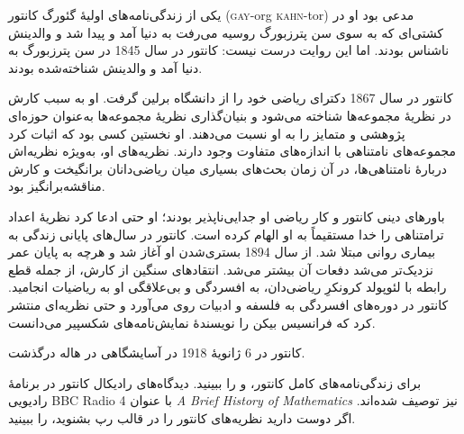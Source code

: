 \documentclass[../../../include/open-logic-section]{subfiles}
\begin{document}



یکی از زندگی‌نامه‌های اولیهٔ گئورگ کانتور
(\textsc{gay}-org \textsc{kahn}-tor) مدعی بود او در کشتی‌ای که به سوی
سن پترزبورگ روسیه می‌رفت به دنیا آمد و پیدا شد و والدینش ناشناس بودند.
اما این روایت درست نیست: کانتور در سال 1845 در سن پترزبورگ به دنیا آمد
و والدینش شناخته‌شده بودند.

کانتور در سال 1867 دکترای ریاضی خود را از دانشگاه برلین گرفت. او به
سبب کارش در نظریهٔ مجموعه‌ها شناخته می‌شود و بنیان‌گذاری نظریهٔ
مجموعه‌ها به‌عنوان حوزه‌ای پژوهشی و متمایز را به او نسبت می‌دهند. او
نخستین کسی بود که اثبات کرد مجموعه‌های نامتناهی با اندازه‌های متفاوت
وجود دارند. نظریه‌های او، به‌ویژه نظریه‌اش دربارهٔ نامتناهی‌ها، در آن
زمان بحث‌های بسیاری میان ریاضی‌دانان برانگیخت و کارش مناقشه‌برانگیز بود.

باورهای دینی کانتور و کار ریاضی او جدایی‌ناپذیر بودند؛ او حتی ادعا کرد
نظریهٔ اعداد ترامتناهی را خدا مستقیماً به او الهام کرده است. کانتور در
سال‌های پایانی زندگی به بیماری روانی مبتلا شد. از سال 1894 بستری‌شدن
او آغاز شد و هرچه به پایان عمر نزدیک‌تر می‌شد دفعات آن بیشتر می‌شد.
انتقادهای سنگین از کارش، از جمله قطع رابطه با لئوپولد کرونکرِ
ریاضی‌دان، به افسردگی و بی‌علاقگی او به ریاضیات انجامید. کانتور در
دوره‌های افسردگی به فلسفه و ادبیات روی می‌آورد و حتی نظریه‌ای منتشر
کرد که فرانسیس بیکن را نویسندهٔ نمایش‌نامه‌های شکسپیر می‌دانست.

کانتور در 6 ژانویهٔ 1918 در آسایشگاهی در هاله درگذشت.

\begin{reading}
برای زندگی‌نامه‌های کامل کانتور، \citet{Dauben1990} و
\citet{Grattan-Guinness1971} را ببینید. دیدگاه‌های رادیکال کانتور در
برنامهٔ رادیویی BBC Radio 4 با عنوان
\emph{A Brief History of Mathematics} \citep{Sautoy2014} نیز توصیف
شده‌اند. اگر دوست دارید نظریه‌های کانتور را در قالب رپ بشنوید،
\citet{Rose2012} را ببینید.
\end{reading}
\end{document}
